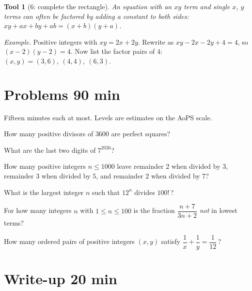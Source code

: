 \documentclass[11pt]{article}
\newtheorem*{tool}{Tool}
\begin{document}
\begin{tool}[6: complete the rectangle]
An equation with an $xy$ term and single $x$, $y$ terms can often be factored by adding a constant to both sides: $xy + ax + by + ab = (x + b)(y + a)$.
\end{tool}
\noindent\emph{Example.} Positive integers with $xy = 2x + 2y$. Rewrite as $xy - 2x - 2y + 4 = 4$, so $(x - 2)(y - 2) = 4$. Now list the factor pairs of $4$: $(x, y) = (3, 6),\ (4, 4),\ (6, 3)$.

\section{Problems \hfill 90 min}

Fifteen minutes each at most. Levels are estimates on the AoPS scale.

\begin{problem}[level 2]
How many positive divisors of $3600$ are perfect squares?
\end{problem}

\begin{problem}[level 2]
What are the last two digits of $7^{2026}$?
\end{problem}

\begin{problem}[level 2.5]
How many positive integers $n \le 1000$ leave remainder $2$ when divided by $3$, remainder $3$ when divided by $5$, and remainder $2$ when divided by $7$?
\end{problem}

\begin{problem}[level 2.5]
What is the largest integer $n$ such that $12^n$ divides $100!$\,?
\end{problem}

\begin{problem}[level 3]
For how many integers $n$ with $1 \le n \le 100$ is the fraction $\dfrac{n + 7}{3n + 2}$ \emph{not} in lowest terms?
\end{problem}

\begin{problem}[level 3]
How many ordered pairs of positive integers $(x, y)$ satisfy $\dfrac{1}{x} + \dfrac{1}{y} = \dfrac{1}{12}$\,?
\end{problem}

\section{Write-up \hfill 20 min}
\end{document}
